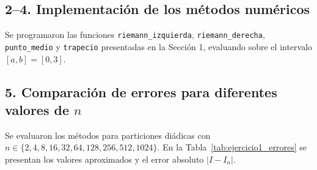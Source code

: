 \documentclass[11pt,a4paper]{article}
\begin{document}
\subsection{2--4. Implementación de los métodos numéricos}
Se programaron las funciones \texttt{riemann\_izquierda}, \texttt{riemann\_derecha}, \texttt{punto\_medio} y \texttt{trapecio} presentadas en la Sección 1, evaluando sobre el intervalo $[a, b] = [0, 3]$.

\subsection{5. Comparación de errores para diferentes valores de $n$}
Se evaluaron los métodos para particiones diádicas con $n \in \{2, 4, 8, 16, 32, 64, 128, 256, 512, 1024\}$. En la Tabla~\ref{tab:ejercicio1_errores} se presentan los valores aproximados y el error absoluto $|I - I_n|$.
\end{document}
